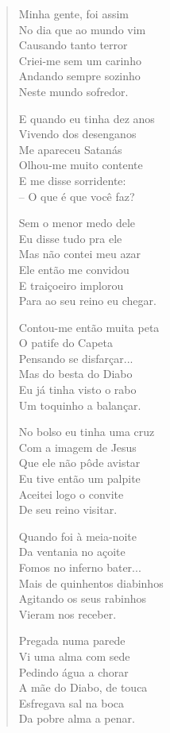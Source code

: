 \begin{verse}
Minha gente, foi assim\\
No dia que ao mundo vim\\
Causando tanto terror\\
Criei-me sem um carinho\\
Andando sempre sozinho\\
Neste mundo sofredor.
\pagebreak

E quando eu tinha dez anos\\
Vivendo dos desenganos\\
Me apareceu Satanás\\
Olhou-me muito contente\\
E me disse sorridente:\\
– O que é que você faz?

Sem o menor medo dele\\
Eu disse tudo pra ele\\
Mas não contei meu azar\\
Ele então me convidou\\
E traiçoeiro implorou\\
Para ao seu reino eu chegar.

Contou-me então muita peta\\
O patife do Capeta\\
Pensando se disfarçar...\\
Mas do besta do Diabo\\
Eu já tinha visto o rabo\\
Um toquinho a balançar.

No bolso eu tinha uma cruz\\
Com a imagem de Jesus\\
Que ele não pôde avistar\\
Eu tive então um palpite\\
Aceitei logo o convite\\
De seu reino visitar.
\pagebreak

Quando foi à meia-noite\\
Da ventania no açoite\\
Fomos no inferno bater...\\
Mais de quinhentos diabinhos\\
Agitando os seus rabinhos\\
Vieram nos receber.

Pregada numa parede\\
Vi uma alma com sede\\
Pedindo água a chorar\\
A mãe do Diabo, de touca\\
Esfregava sal na boca\\
Da pobre alma a penar.


\end{verse}
